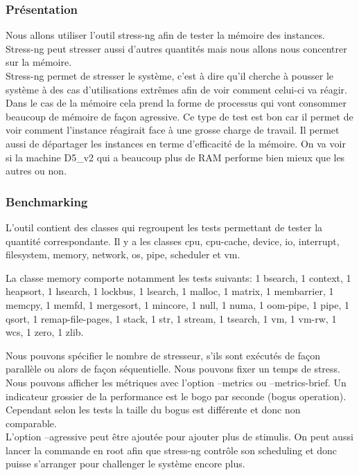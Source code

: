 \documentclass[11pt]{article}
\begin{document}
\subsubsection{Présentation}
	Nous allons utiliser l'outil stress-ng afin de tester la mémoire des
	instances. Stress-ng peut stresser aussi d'autres quantités mais nous
	allons nous concentrer sur la mémoire.\\
	Stress-ng permet de stresser le système, c'est à dire qu'il cherche
	à pousser le système à des cas d'utilisations extrêmes afin de voir 
	comment celui-ci va réagir. Dans le cas de la mémoire cela prend
	la forme de processus qui vont consommer beaucoup de mémoire de
	façon agressive. Ce type de test est bon car il permet de voir
	comment l'instance réagirait face à une grosse charge de travail.
	Il permet aussi de départager les instances en terme d'efficacité
	de la mémoire. On va voir si la machine D5\_v2 qui a beaucoup
	plus de RAM performe bien mieux que les autres ou non.

\subsubsection{Benchmarking}
	L'outil contient des classes qui regroupent les tests permettant de
	tester la quantité correspondante. Il y a les classes cpu, cpu-cache,
	device, io, interrupt, filesystem, memory, network, os, pipe, scheduler
	et vm.

	La classe memory comporte notamment les tests suivants:
	1 bsearch, 1 context, 1 heapsort, 1 hsearch, 1 lockbus, 1 lsearch, 1
	malloc, 1 matrix, 1 membarrier, 1 memcpy, 1 memfd, 1 mergesort, 1
	mincore, 1 null, 1 numa, 1 oom-pipe, 1 pipe, 1 qsort, 1
	remap-file-pages, 1 stack, 1 str, 1 stream, 1 tsearch, 1 vm, 1 vm-rw, 1
	wcs, 1 zero, 1 zlib.

	Nous pouvons spécifier le nombre de stresseur, s'ils sont exécutés de façon
	parallèle ou alors de façon séquentielle.
	Nous pouvons fixer un temps de stress.
	Nous pouvons afficher les métriques avec l'option --metrics ou 
	--metrics-brief. Un indicateur grossier de la performance est le bogo par 
	seconde (bogus operation). Cependant selon les tests la taille du bogus
	est différente et donc non comparable. \\
	L'option --agressive peut être ajoutée pour ajouter plus de stimulis.
	On peut aussi lancer la commande en root afin que stress-ng contrôle
	son scheduling et donc puisse s'arranger pour challenger le système 
	encore plus.
\end{document}
